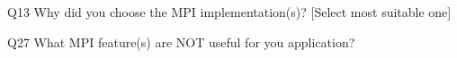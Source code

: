 \begin{description}%
\item{Q13} Why did you choose the MPI implementation(s)? [Select most suitable one]%
\item{Q27} What MPI feature(s) are NOT useful for you application?%
\end{description}%
